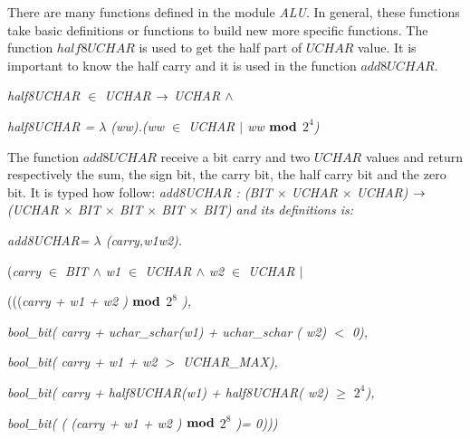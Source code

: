 \documentclass[11pt]{article} %
\begin{document}
There are many functions defined in the module \textit{ALU}. In general, these functions take basic definitions or functions
to build new more specific functions. The function $\mathit{half8UCHAR}$ is used to get the half part of $\mathit{UCHAR}$ value.
It is important to know the half carry and it is used in the function $\mathit{add8UCHAR}$. 

\hspace*{0.0in}

\hspace*{0.0in}\it half8UCHAR  $\in$  \it UCHAR  $\fun$  \it UCHAR  $\land$ 

\hspace*{0.0in}\it half8UCHAR \rm =  $\lambda$  \rm (\it ww\rm )\rm .\rm (\it ww  $\in$  \it UCHAR  $\mid$  \it ww  $\mod$  \it $2^{4}$\rm )

\hspace*{0.0in}

 
The function $\mathit{add8UCHAR}$ receive a bit carry and two $\mathit{UCHAR}$ values and return respectively the 
sum, the sign bit, the carry bit, the half carry bit and the zero bit. It is typed how follow: \it add8UCHAR \rm :
\rm (\it BIT $\times$ \it UCHAR $\times$ \it UCHAR\rm ) $\fun$ \rm (\it UCHAR $\times$  \it BIT  $\times$  \it BIT  $\times$  \it BIT  $\times$  \it BIT\rm ) and its definitions is:

\hspace*{0.0in}\it add8UCHAR\rm = $\lambda$ \rm(\it carry\rm,\it w1\rm \it w2\rm)\rm.\rm

\hspace*{0.0in}(\it carry $\in$  \it BIT  $\land$  \it w1  $\in$  \it UCHAR  $\land$  \it w2  $\in$  \it UCHAR
$\mid$

\hspace*{0.40in}\rm(\rm(\rm(\it carry \rm + \it w1 \rm + \it w2 \rm )  $\mod$  \it $2^{8}$ \rm ),

\hspace*{0.40in}\it bool\_bit\rm ( \it carry \rm + \it uchar\_schar\rm (\it w1\rm ) \rm + \it uchar\_schar \rm (\it
w2\rm ) $<$ \rm 0\rm ),

\hspace*{0.40in}\it bool\_bit\rm ( \it carry \rm + \it w1 \rm + \it w2 $>$ \it UCHAR\_MAX\rm )\rm ,

\hspace*{0.40in}\it bool\_bit\rm ( \it carry \rm + \it half8UCHAR\rm (\it w1\rm ) \rm + \it half8UCHAR\rm ( \it
w2\rm )  $\geq$  \it $2^{4}$\rm )\rm,

\hspace*{0.40in}\it bool\_bit\rm ( \rm ( \rm (\it carry \rm + \it w1 \rm + \it w2 \rm )  $\mod$  \it $2^{8}$ \rm
)\rm = \rm 0\rm )\rm )\hspace*{0.10in}\rm )
\end{document}
